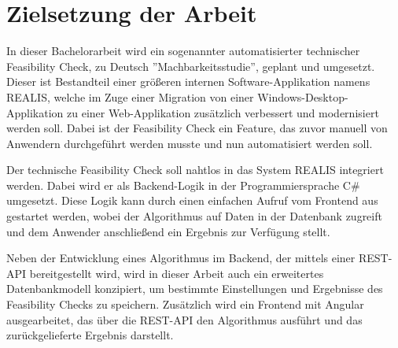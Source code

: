 \section{Zielsetzung der Arbeit}
In dieser Bachelorarbeit wird ein sogenannter automatisierter technischer Feasibility Check, zu Deutsch ''Machbarkeitsstudie'', geplant und umgesetzt. Dieser ist Bestandteil einer größeren internen Software-Applikation namens \gls{REALIS}, welche
im Zuge einer Migration von einer Windows-Desktop-Applikation zu einer Web-Applikation zusätzlich verbessert und modernisiert werden soll. Dabei ist der Feasibility Check ein Feature, das zuvor manuell von Anwendern durchgeführt werden musste und nun automatisiert werden soll.

Der technische Feasibility Check soll nahtlos in das System \gls{REALIS} integriert werden. Dabei wird er als Backend-Logik in der Programmiersprache C\# umgesetzt. Diese Logik kann durch einen einfachen Aufruf vom Frontend aus gestartet werden, wobei der Algorithmus auf Daten in der Datenbank zugreift und dem Anwender anschließend ein Ergebnis zur Verfügung stellt.

Neben der Entwicklung eines Algorithmus im Backend, der mittels einer REST-API bereitgestellt wird, wird in dieser Arbeit auch ein erweitertes Datenbankmodell konzipiert, um bestimmte Einstellungen und Ergebnisse des Feasibility Checks zu speichern. Zusätzlich wird ein Frontend mit Angular ausgearbeitet, das über die REST-API den Algorithmus ausführt und das zurückgelieferte Ergebnis darstellt.